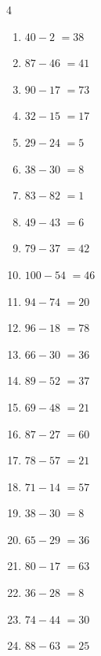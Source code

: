 \begin{multicols}{4}
\begin{enumerate}
  \item $40-2$
        $=38$

  \item $87-46$
        $=41$

  \item $90-17$
        $=73$

  \item $32-15$
        $=17$

  \item $29-24$
        $=5$

  \item $38-30$
        $=8$

  \item $83-82$
        $=1$

  \item $49-43$
        $=6$

  \item $79-37$
        $=42$

  \item $100-54$
        $=46$

  \item $94-74$
        $=20$

  \item $96-18$
        $=78$

  \item $66-30$
        $=36$

  \item $89-52$
        $=37$

  \item $69-48$
        $=21$

  \item $87-27$
        $=60$

  \item $78-57$
        $=21$

  \item $71-14$
        $=57$

  \item $38-30$
        $=8$

  \item $65-29$
        $=36$

  \item $80-17$
        $=63$

  \item $36-28$
        $=8$

  \item $74-44$
        $=30$

  \item $88-63$
        $=25$


\end{enumerate}
\end{multicols}
